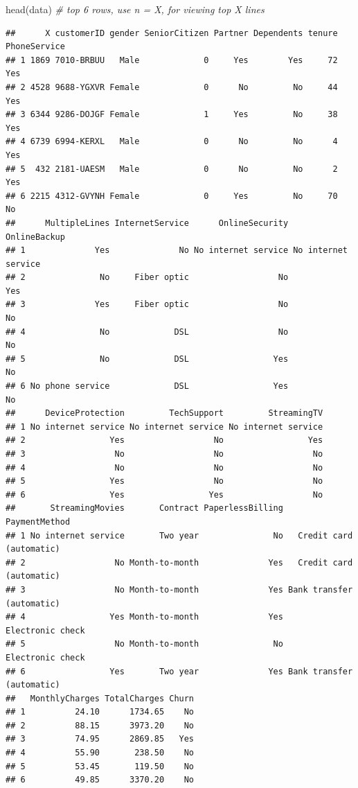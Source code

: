 \documentclass[
]{book}
\newenvironment{Shaded}{\begin{snugshade}}{\end{snugshade}}
\newcommand{\CommentTok}[1]{\textcolor[rgb]{0.56,0.35,0.01}{\textit{#1}}}
\newcommand{\FunctionTok}[1]{\textcolor[rgb]{0.00,0.00,0.00}{#1}}
\newcommand{\NormalTok}[1]{#1}
\begin{document}
\begin{Shaded}
\begin{Highlighting}[]
\FunctionTok{head}\NormalTok{(data) }\CommentTok{\# top 6 rows, use n = X, for viewing top X lines}
\end{Highlighting}
\end{Shaded}

\begin{verbatim}
##      X customerID gender SeniorCitizen Partner Dependents tenure PhoneService
## 1 1869 7010-BRBUU   Male             0     Yes        Yes     72          Yes
## 2 4528 9688-YGXVR Female             0      No         No     44          Yes
## 3 6344 9286-DOJGF Female             1     Yes         No     38          Yes
## 4 6739 6994-KERXL   Male             0      No         No      4          Yes
## 5  432 2181-UAESM   Male             0      No         No      2          Yes
## 6 2215 4312-GVYNH Female             0     Yes         No     70           No
##      MultipleLines InternetService      OnlineSecurity        OnlineBackup
## 1              Yes              No No internet service No internet service
## 2               No     Fiber optic                  No                 Yes
## 3              Yes     Fiber optic                  No                  No
## 4               No             DSL                  No                  No
## 5               No             DSL                 Yes                  No
## 6 No phone service             DSL                 Yes                  No
##      DeviceProtection         TechSupport         StreamingTV
## 1 No internet service No internet service No internet service
## 2                 Yes                  No                 Yes
## 3                  No                  No                  No
## 4                  No                  No                  No
## 5                 Yes                  No                  No
## 6                 Yes                 Yes                  No
##       StreamingMovies       Contract PaperlessBilling             PaymentMethod
## 1 No internet service       Two year               No   Credit card (automatic)
## 2                  No Month-to-month              Yes   Credit card (automatic)
## 3                  No Month-to-month              Yes Bank transfer (automatic)
## 4                 Yes Month-to-month              Yes          Electronic check
## 5                  No Month-to-month               No          Electronic check
## 6                 Yes       Two year              Yes Bank transfer (automatic)
##   MonthlyCharges TotalCharges Churn
## 1          24.10      1734.65    No
## 2          88.15      3973.20    No
## 3          74.95      2869.85   Yes
## 4          55.90       238.50    No
## 5          53.45       119.50    No
## 6          49.85      3370.20    No
\end{verbatim}
\end{document}
